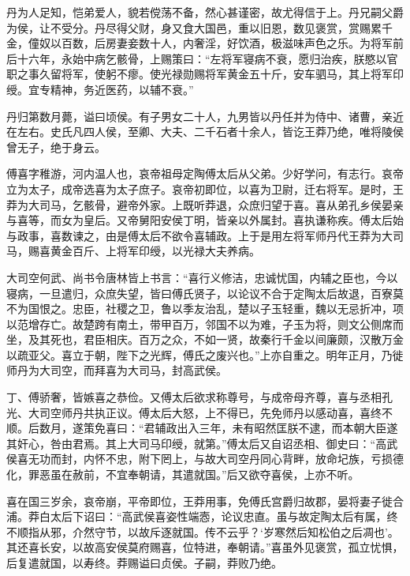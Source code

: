 \documentclass[12pt,UTF8]{ctexbook}
\begin{document}
丹为人足知，恺弟爱人，貌若傥荡不备，然心甚谨密，故尤得信于上。丹兄嗣父爵为侯，让不受分。丹尽得父财，身又食大国邑，重以旧恩，数见褒赏，赏赐累千金，僮奴以百数，后房妻妾数十人，内奢淫，好饮酒，极滋味声色之乐。为将军前后十六年，永始中病乞骸骨，上赐策曰：“左将军寝病不衰，愿归治疾，朕愍以官职之事久留将军，使躬不瘳。使光禄勋赐将军黄金五十斤，安车驷马，其上将军印绶。宜专精神，务近医药，以辅不衰。”



丹归第数月薨，谥曰顷侯。有子男女二十人，九男皆以丹任并为侍中、诸曹，亲近在左右。史氏凡四人侯，至卿、大夫、二千石者十余人，皆讫王莽乃绝，唯将陵侯曾无子，绝于身云。



傅喜字稚游，河内温人也，哀帝祖母定陶傅太后从父弟。少好学问，有志行。哀帝立为太子，成帝选喜为太子庶子。哀帝初即位，以喜为卫尉，迁右将军。是时，王莽为大司马，乞骸骨，避帝外家。上既听莽退，众庶归望于喜。喜从弟孔乡侯晏亲与喜等，而女为皇后。又帝舅阳安侯丁明，皆亲以外属封。喜执谦称疾。傅太后始与政事，喜数谏之，由是傅太后不欲令喜辅政。上于是用左将军师丹代王莽为大司马，赐喜黄金百斤、上将军印绶，以光禄大夫养病。



大司空何武、尚书令唐林皆上书言：“喜行义修洁，忠诚忧国，内辅之臣也，今以寝病，一旦遣归，众庶失望，皆曰傅氏贤子，以论议不合于定陶太后故退，百寮莫不为国恨之。忠臣，社稷之卫，鲁以季友治乱，楚以子玉轻重，魏以无忌折冲，项以范增存亡。故楚跨有南土，带甲百万，邻国不以为难，子玉为将，则文公侧席而坐，及其死也，君臣相庆。百万之众，不如一贤，故秦行千金以间廉颇，汉散万金以疏亚父。喜立于朝，陛下之光辉，傅氏之废兴也。”上亦自重之。明年正月，乃徙师丹为大司空，而拜喜为大司马，封高武侯。



丁、傅骄奢，皆嫉喜之恭俭。又傅太后欲求称尊号，与成帝母齐尊，喜与丞相孔光、大司空师丹共执正议。傅太后大怒，上不得已，先免师丹以感动喜，喜终不顺。后数月，遂策免喜曰：“君辅政出入三年，未有昭然匡朕不逮，而本朝大臣遂其奸心，咎由君焉。其上大司马印绶，就第。”傅太后又自诏丞相、御史曰：“高武侯喜无功而封，内怀不忠，附下罔上，与故大司空丹同心背畔，放命圮族，亏损德化，罪恶虽在赦前，不宜奉朝请，其遣就国。”后又欲夺喜侯，上亦不听。



喜在国三岁余，哀帝崩，平帝即位，王莽用事，免傅氏宫爵归故郡，晏将妻子徙合浦。莽白太后下诏曰：“高武侯喜姿性端悫，论议忠直。虽与故定陶太后有属，终不顺指从邪，介然守节，以故斥逐就国。传不云乎？‘岁寒然后知松伯之后凋也’。其还喜长安，以故高安侯莫府赐喜，位特进，奉朝请。”喜虽外见褒赏，孤立忧惧，后复遣就国，以寿终。莽赐谥曰贞侯。子嗣，莽败乃绝。
\end{document}
